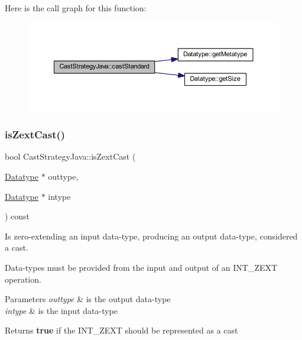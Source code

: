 Here is the call graph for this function\+:
\nopagebreak
\begin{figure}[H]
\begin{center}
\leavevmode
\includegraphics[width=350pt]{class_cast_strategy_java_a6a9d4ec935035f52d214326cb6e0a33f_cgraph}
\end{center}
\end{figure}
\mbox{\label{class_cast_strategy_java_a6c8536d19ca90746652c78d0781e98b6}} 
\subsubsection{\texorpdfstring{isZextCast()}{isZextCast()}}
{\footnotesize\ttfamily bool Cast\+Strategy\+Java\+::is\+Zext\+Cast (\begin{DoxyParamCaption}\item[{\mbox{\hyperlink{class_datatype}{Datatype}} $\ast$}]{outtype,  }\item[{\mbox{\hyperlink{class_datatype}{Datatype}} $\ast$}]{intype }\end{DoxyParamCaption}) const\hspace{0.3cm}{\ttfamily [virtual]}}



Is zero-\/extending an input data-\/type, producing an output data-\/type, considered a cast. 

Data-\/types must be provided from the input and output of an I\+N\+T\+\_\+\+Z\+E\+XT operation. 
\begin{DoxyParams}{Parameters}
{\em outtype} & is the output data-\/type \\
\hline
{\em intype} & is the input data-\/type \\
\hline
\end{DoxyParams}
\begin{DoxyReturn}{Returns}
{\bfseries{true}} if the I\+N\+T\+\_\+\+Z\+E\+XT should be represented as a cast 
\end{DoxyReturn}


